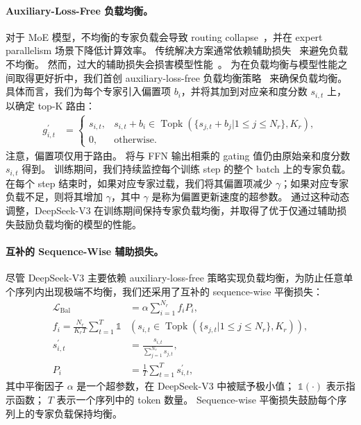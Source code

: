\documentclass[11pt, a4paper, logo, copyright, nonumbering]{deepseek}
\newcommand{\dsviii}{DeepSeek-V3}
\begin{document}
\paragraph{Auxiliary-Loss-Free 负载均衡。}
对于 MoE 模型，不均衡的专家负载会导致 routing collapse~\citep{moe}，并在 expert parallelism 场景下降低计算效率。
传统解决方案通常依赖辅助损失~\citep{switch,gshard} 来避免负载不均衡。
然而，过大的辅助损失会损害模型性能~\citep{noaux_tc}。
为在负载均衡与模型性能之间取得更好折中，我们首创 auxiliary-loss-free 负载均衡策略~\citep{noaux_tc} 来确保负载均衡。
具体而言，我们为每个专家引入偏置项 $b_i$，并将其加到对应亲和度分数 $s_{i,t}$ 上，以确定 top-K 路由：
\begin{align}
    g^{\prime}_{i,t} & = \begin{cases} 
    s_{i,t}, & s_{i,t} + b_i \in \operatorname{Topk} (\{ s_{j, t} + b_j | 1 \leq j \leq N_r \}, K_{r}), \\
    0, & \text{otherwise}.
    \end{cases}
\end{align}
注意，偏置项仅用于路由。
将与 FFN 输出相乘的 gating 值仍由原始亲和度分数 $s_{i,t}$ 得到。
训练期间，我们持续监控每个训练 step 的整个 batch 上的专家负载。
在每个 step 结束时，如果对应专家过载，我们将其偏置项减少 $\gamma$；如果对应专家负载不足，则将其增加 $\gamma$，其中 $\gamma$ 是称为偏置更新速度的超参数。
通过这种动态调整，\dsviii{} 在训练期间保持专家负载均衡，并取得了优于仅通过辅助损失鼓励负载均衡的模型的性能。

\paragraph{互补的 Sequence-Wise 辅助损失。}
尽管 \dsviii{} 主要依赖 auxiliary-loss-free 策略实现负载均衡，为防止任意单个序列内出现极端不均衡，我们还采用了互补的 sequence-wise 平衡损失：
\begin{align}
    \mathcal{L}_{\mathrm{Bal}} & = \alpha \sum_{i=1}^{N_r}{f_i P_i}, \\
    f_i = \frac{N_r}{K_r T} \sum_{t=1}^{T} \mathds{1} & \left( s_{i,t} \in \operatorname{Topk} ( \{ s_{j, t} | 1 \leq j \leq N_r \}, K_{r} ) \right), \\
    s^{\prime}_{i,t} & = \frac{s_{i,t}}{\sum_{j=1}^{N_r} s_{j,t}}, \\
    P_i & = \frac{1}{T} \sum_{t=1}^{T}{s^{\prime}_{i,t}},
\end{align}
其中平衡因子 $\alpha$ 是一个超参数，在 \dsviii{} 中被赋予极小值；
$\mathds{1}(\cdot)$ 表示指示函数；
$T$ 表示一个序列中的 token 数量。
Sequence-wise 平衡损失鼓励每个序列上的专家负载保持均衡。
\end{document}
